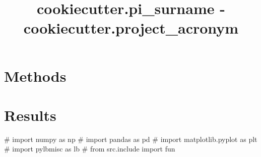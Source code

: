 \documentclass{article}
\begin{document}
\title{ {{cookiecutter.pi_surname}} - {{cookiecutter.project_acronym}} }
\maketitle
\tableofcontents


\section{Methods}

\section{Results}


\begin{pycode}
# import numpy as np
# import pandas as pd
# import matplotlib.pyplot as plt
# import pylbmisc as lb
# from src.include import fun
\end{pycode}




\printbibliography 
\end{document}
